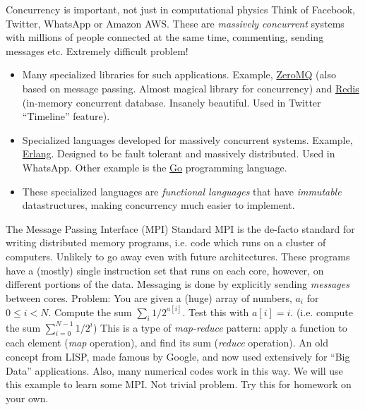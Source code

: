 \documentclass[aspectratio=169]{beamer}
\newcommand{\mypause}{\pause}
\begin{document}
\begin{frame}{Concurrency is important, not just in computational physics}
  Think of Facebook, Twitter, WhatsApp or Amazon AWS. These are
  \emph{massively concurrent} systems with millions of people
  connected at the same time, commenting, sending messages
  etc. Extremely difficult problem!%
  \mypause%
  \begin{itemize}
  \item Many specialized libraries for such applications. Example,
    \href{https://zeromq.org}{ZeroMQ} (also based on message
    passing. Almost magical library for concurrency) and
    \href{https://redis.io}{Redis} (in-memory concurrent
    database. Insanely beautiful. Used in Twitter ``Timeline''
    feature).%
    \mypause%
  \item Specialized languages developed for massively concurrent
    systems. Example, \href{https://www.erlang.org}{Erlang}. Designed
    to be fault tolerant and massively distributed. Used in
    WhatsApp. Other example is the \href{https://golang.org}{Go}
    programming language.
  \item These specialized languages are \emph{functional languages}
    that have \emph{immutable} datastructures, making concurrency much
    easier to implement.
  \end{itemize}
  
\end{frame}


\begin{frame}{The Message Passing Interface (MPI) Standard}
  \footnotesize%
  MPI is the de-facto standard for writing {\color{blue} distributed
    memory} programs, i.e. code which runs on a cluster of
  computers. Unlikely to go away even with future architectures.%
  \vskip0.1in%
  These programs have a (mostly) single instruction set that runs on
  each core, however, on different portions of the data. Messaging is
  done by explicitly sending \emph{messages} between cores.%
  \vskip0.1in%
  \mypause%
  {\color{blue} Problem: You are given a (huge) array of numbers,
    $a_i$ for $0\le i < N$. Compute the sum $\sum_i 1/2^{a[i]}$.  Test
    this with $a[i] = i$. (i.e. compute the sum
    $\sum_{i=0}^{N-1} 1/2^i$)} \mypause%
  \vskip0.1in%
  This is a type of \emph{map-reduce} pattern: apply a function to
  each element (\emph{map} operation), and find its sum (\emph{reduce}
  operation). An old concept from LISP, made famous by Google, and now
  used extensively for ``Big Data'' applications. Also, many numerical
  codes work in this way.%
  \vskip0.1in%
  We will use this example to learn some MPI. {\color{blue} Not
    trivial problem. Try this for homework on your own.}
\end{frame}
\end{document}
